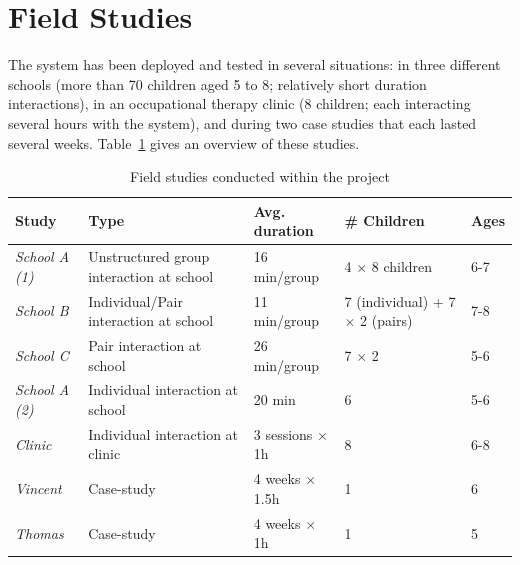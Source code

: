 \documentclass{article}
\begin{document}
\section{Field Studies}

The system has been deployed and tested in several situations: in three
different schools (more than 70 children aged 5 to 8; relatively short duration
interactions), in an occupational therapy clinic (8 children; each
interacting several hours with the system), and during two case studies that
each lasted several weeks. Table~\ref{studies} gives an overview of these
studies.

\begin{table}[ht!]
\centering
\caption{\small Field studies conducted within the project}
\label{studies}
\footnotesize
\begin{tabular}{@{}lp{4cm}p{2.2cm}p{2cm}l@{}}
\toprule
{\bf Study}        & {\bf Type}                               & {\bf Avg. duration}    & {\bf \# Children}                     & {\bf Ages} \\ \midrule
{\it School A (1)} & Unstructured group interaction at school & 16 min/group           & 4 $\times$ 8 children                 & 6-7        \\
{\it School B}     & Individual/Pair interaction at school    & 11 min/group           & 7 (individual) + 7 $\times$ 2 (pairs) & 7-8        \\
{\it School C}     & Pair interaction at school               & 26 min/group           & 7 $\times$ 2                          & 5-6        \\
{\it School A (2)} & Individual interaction at school         & 20 min                 & 6                                     & 5-6        \\ \midrule
{\it Clinic}       & Individual interaction at clinic         & 3 sessions $\times$ 1h & 8                                     & 6-8        \\ \midrule 
{\it Vincent}      & Case-study                               & 4 weeks $\times$ 1.5h  & 1                                     & 6          \\
{\it Thomas}       & Case-study                               & 4 weeks $\times$ 1h    & 1                                     & 5          \\ \bottomrule
\end{tabular}
\end{table}
\end{document}
